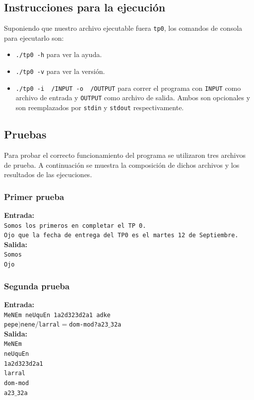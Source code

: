 \documentclass[a4paper, 10pt]{article}
\def\code#1{\texttt{#1}}
\newcommand\tab[1][0.5cm]{\hspace*{#1}}
\begin{document}
		\subsection{Instrucciones para la ejecución}
			Suponiendo que nuestro archivo ejecutable fuera \code{tp0}, los comandos de consola para ejecutarlo
			son:
			\begin{itemize}
				\item \code{./tp0 -h} para ver la ayuda.
				\item \code{./tp0 -v} para ver la versión.
				\item \code{./tp0 -i ~/INPUT -o ~/OUTPUT}  para correr el programa con \code{INPUT} como archivo de entrada
				y \code{OUTPUT} como archivo de salida. Ambos son opcionales y son reemplazados por \code{stdin} y \code{stdout}
				respectivamente.
			\end{itemize}
		\subsection{Pruebas}
			Para probar el correcto funcionamiento del programa se utilizaron tres archivos de prueba. A continuación
			se muestra la composición de dichos archivos y los resultados de las ejecuciones.
			\subsubsection{Primer prueba}
				\textbf{Entrada:}\\
				\tab\tab\code{Somos los primeros en completar el TP 0.}\\
				\tab\tab\code{Ojo que la fecha de entrega del TP0 es el martes 12 de Septiembre.}\\
				\tab\textbf{Salida:}\\
				\tab\tab\code{Somos}\\
				\tab\tab\code{Ojo}
			\subsubsection{Segunda prueba}
				\textbf{Entrada:}\\
				\tab\tab\code{MeNEm neUquEn 1a2d323d2a1 adke}\\
				\tab\tab\code{pepe$)$nene$/$larral$=$dom-mod?a23$\_$32a}\\
				\tab\textbf{Salida:}\\
				\tab\tab\code{MeNEm}\\
				\tab\tab\code{neUquEn}\\
				\tab\tab\code{1a2d323d2a1}\\
				\tab\tab\code{larral}\\
				\tab\tab\code{dom-mod}\\
				\tab\tab\code{a23$\_$32a}
\end{document}

